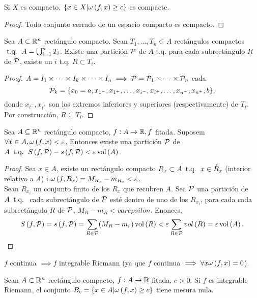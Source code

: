 \begin{col*}
    Si $X$ es compacto, $\{x \in X | \omega \left( f, x \right) \geq c\}$ es compacte.
\end{col*}
\begin{proof}
    Todo conjunto cerrado de un espacio compacto es compacto.
\end{proof}
\begin{lema}\label{lema:teo_lebesque}
    Sea $A \subset \mathbb{R}^n$ rectángulo compacto. Sean $T_1, \dots, T_n \subset A$ rectángulos compactos $\operatorname{\text{ t.q. }} A = \bigcup_{i=1}^n T_i$. Existe una partición $\mathcal{P}$ de $A$ t.q. para cada subrectángulo $R$ de $\mathcal{P}$, existe un $i$ t.q. $R \subset T_i$.
\end{lema}
\begin{proof}
    $A = I_1 \times \dots \times I_k \times \dots \times I_n \implies \mathcal{P} = \mathcal{P}_1 \times \dots \times \mathcal{P}_n$ cada
    \[ \mathcal{P}_k = \{x_0 = a, x_{1^-}, x_{1^+}, \dots, x_{i^-}, x_{i^+}, \dots, x_{n^-}, x_{n^+}, b\}, \]
    donde $x_{i^-}, x_{i^+}$ son los extremos inferiores y superiores (respectivamente) de $T_i$. Por construcción, $R \subseteq T_i$.
\end{proof}
\begin{lema*}\label{lema:uno_lebesque}
    Sea $A \subseteq \mathbb{R}^n$ rectángulo compacto, $f : A \to \mathbb{R}, f$ fitada. Suposem $\forall x  \in A, \omega \left( f, x \right) < \varepsilon$. Entonces existe una partición $\mathcal{P}$ de $A \operatorname{\text{ t.q. }} S \left( f, \mathcal{P} \right) - s \left( f, \mathcal{P} \right) < \varepsilon \operatorname{vol} \left( A \right)$.
\end{lema*}
\begin{proof}
    Sea $x \in A$, existe un rectángulo compacto $R_x \subset A \operatorname{\text{ t.q. }} x \in \mathring{R}_x$ (interior relativo a $A$) i $\omega \left( f, R_x \right) = M_{R_x} - m_{R_x} < \varepsilon$. \\
    Sean $R_{x_i}$ un conjunto finito de los $R_x$ que recubren $A$. Sea $\mathcal{P}$ una partición de $A \operatorname{\text{ t.q. }}$ cada subrectángulo de $\mathcal{P}$ esté dentro de uno de los $R_{x_i}$, para cada cada subrectángulo $R$ de $\mathcal{P}$, $M_R - m_R < varepsilon$. Enonces,
    \[ S \left( f,\mathcal{P} \right) = s \left( f,\mathcal{P} \right) = \sum_{R \in \mathcal{P}} (M_R - m_r) \operatorname{vol} \left( R \right) < \varepsilon \sum_{R \in \mathcal{P}} vol \left( R \right) = \varepsilon \operatorname{vol} \left( A \right). \]
\end{proof}
\begin{col*}
    $f$ continua $\implies f$ integrable Riemann (ya que $f$ continua $\implies \forall x \omega \left( f, x \right) = 0$).
\end{col*}
\begin{lema*}[2]\label{lema:dos_lebesque}
    Sean $A \subset \mathbb{R}^n$ rectángulo compacto, $f : A \to \mathbb{R}$ fitada, $c > 0$. Si $f$ es integrable Riemann, el conjunto $B_c = \{x \in A | \omega \left( f, x \right) \geq c\}$ tiene mesura nula.
\end{lema*}
